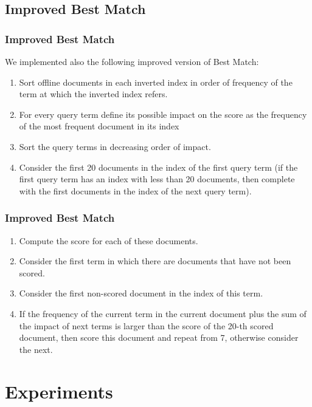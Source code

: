 \documentclass{beamer}
\begin{document}
\subsection{Improved Best Match}
\newcommand{\asuivre}{\setcounter{sauvegardeenumi}{\theenumi}}
\newcommand{\suite}{\setcounter{enumi}{\thesauvegardeenumi}}

\begin{frame}
\frametitle{Improved Best Match}
We implemented also the following improved version of Best Match:
\begin{enumerate}
\item Sort offline documents in each inverted index in order of frequency of the term at which the inverted index refers.
\item For every query term define its possible impact on the score as the frequency of the most frequent document in its index
\item Sort the query terms in decreasing order of impact.
\item Consider the first 20 documents in the index of the first query term (if the first query term has an index with less than 20 documents, then complete with the first documents in the index of the next query term).
\asuivre
\end{enumerate}
\end{frame}

\begin{frame}
\frametitle{Improved Best Match}
\begin{enumerate}	
\suite
\item Compute the score for each of these documents.
\item Consider the first term in which there are documents that have not been scored.
\item Consider the first non-scored document in the index of this term.
\item If the frequency of the current term in the current document plus the sum of the impact of next terms is larger than the score of the 20-th scored document, then score this document and repeat from 7, otherwise consider the next.
\end{enumerate}
\end{frame}

\section{Experiments}
\end{document}

